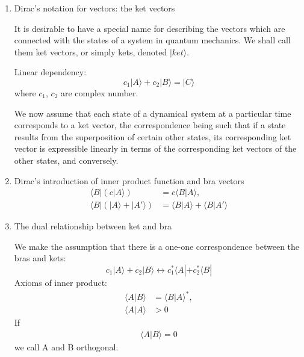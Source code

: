 \documentclass[12pt]{article}
\numberwithin{equation}{section}
\begin{document}
\begin{enumerate}
\item Dirac's notation for vectors: the {\color{red}ket vectors} \par
	It is desirable to have a special name for describing the vectors which are connected with the states of a system in quantum mechanics. We shall call them ket vectors, or simply kets, denoted $|ket \rangle$. \par
	Linear dependency:
	\begin{equation}
		c_1|A\rangle+c_2|B\rangle=|C\rangle
	\end{equation}
	where $c_1$, $c_2$ are complex number. \par
	We now assume that each state of a dynamical system at a particular time corresponds to a ket vector, the correspondence being such that if a state results from the superposition of certain other states, its corresponding ket vector is expressible linearly in terms of the corresponding ket vectors of the other states, and conversely.
\item Dirac's introduction of inner product function and {\color{red}bra vectors} 
	\begin{equation}\begin{split}
		\langle B|(c|A\rangle) &= c\langle B|A\rangle, \\
		\langle B|(|A\rangle+|A'\rangle) &= \langle B|A\rangle + \langle B|A'\rangle
	\end{split}\end{equation}
\item The dual relationship between ket and bra \par
	We make the assumption that there is a one-one correspondence between the bras and kets:
	\begin{equation}
		c_1|A\rangle + c_2|B\rangle \leftrightarrow c_1^*\langle A| + c_2^*\langle B|
	\end{equation}
	Axioms of inner product:
	\begin{equation}\begin{split}
		\langle A|B \rangle &= \langle B|A \rangle^*, \\
		\langle A|A \rangle &> 0 
	\end{split}\end{equation}
	If 
	\begin{equation}\begin{split}
		\langle A|B \rangle = 0
	\end{split}\end{equation}
	we call A and B orthogonal.
\end{enumerate}
\end{document}
